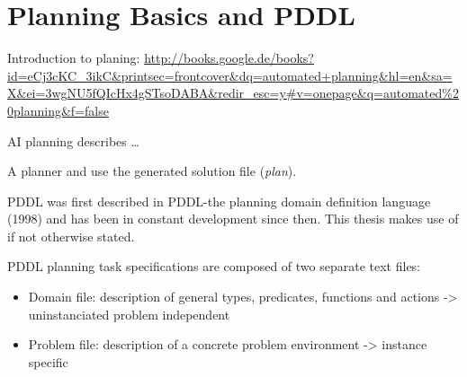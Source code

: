 \documentclass[11pt]{report}
\begin{document}
\chapter{Planning Basics and PDDL}
\label{sec-3}
\begin{center}
\end{center}


Introduction to planing:
\url{http://books.google.de/books?id=eCj3cKC_3ikC&printsec=frontcover&dq=automated+planning&hl=en&sa=X&ei=3wgNU5fQIcHx4gSTsoDABA&redir_esc=y#v=onepage&q=automated%20planning&f=false}

AI planning describes \ldots{}

A planner and use the generated solution file (\emph{plan}).

PDDL was first described in PDDL-the planning domain definition
language (1998) and has been in constant development since then.
This thesis makes use of \textcite{pddl3.1} if not otherwise stated. 

PDDL planning task specifications are composed of two separate text files:

\begin{itemize}
\item Domain file: description of general types, predicates, functions
and actions -> uninstanciated problem independent
\item Problem file: description of a concrete problem environment -> instance speciﬁc
\end{itemize}
\end{document}
